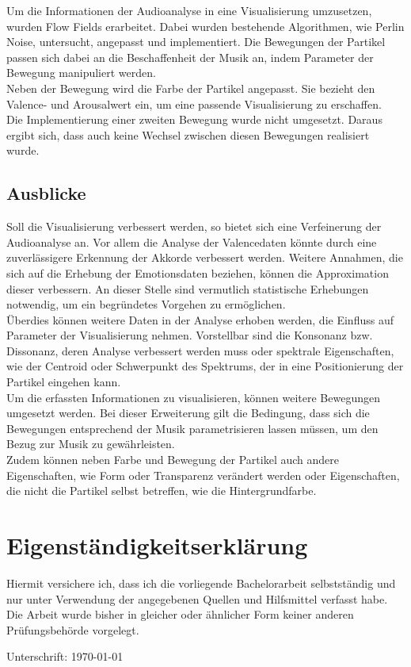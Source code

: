 \documentclass[11pt,a4paper]{article}
\begin{document}
Um die Informationen der Audioanalyse in eine Visualisierung umzusetzen, wurden Flow Fields erarbeitet. Dabei wurden bestehende Algorithmen, wie Perlin Noise, untersucht, angepasst und implementiert. Die Bewegungen der Partikel passen sich dabei an die Beschaffenheit der Musik an, indem Parameter der Bewegung manipuliert werden.\\
Neben der Bewegung wird die Farbe der Partikel angepasst. Sie bezieht den Valence- und Arousalwert ein, um eine passende Visualisierung zu erschaffen.\\
Die Implementierung einer zweiten Bewegung wurde nicht umgesetzt. Daraus ergibt sich, dass auch keine Wechsel zwischen diesen Bewegungen realisiert wurde.\\

\subsection*{Ausblicke}
Soll die Visualisierung verbessert werden, so bietet sich eine Verfeinerung der Audioanalyse an. Vor allem die Analyse der Valencedaten könnte durch eine zuverlässigere Erkennung der Akkorde verbessert werden. Weitere Annahmen, die sich auf die Erhebung der Emotionsdaten beziehen, können die Approximation dieser verbessern. An dieser Stelle sind vermutlich statistische Erhebungen notwendig, um ein begründetes Vorgehen zu ermöglichen.\\
Überdies können weitere Daten in der Analyse erhoben werden, die Einfluss auf Parameter der Visualisierung nehmen. Vorstellbar sind die Konsonanz bzw. Dissonanz, deren Analyse verbessert werden muss oder spektrale Eigenschaften, wie der Centroid oder Schwerpunkt des Spektrums, der in eine Positionierung der Partikel eingehen kann.\\
Um die erfassten Informationen zu visualisieren, können weitere Bewegungen umgesetzt werden. Bei dieser Erweiterung gilt die Bedingung, dass sich die Bewegungen entsprechend der Musik parametrisieren lassen müssen, um den Bezug zur Musik zu gewährleisten.\\
Zudem können neben Farbe und Bewegung der Partikel auch andere Eigenschaften, wie Form oder Transparenz verändert werden oder Eigenschaften, die nicht die Partikel selbst betreffen, wie die Hintergrundfarbe.


\newpage


\newpage
\listoftables
\listoffigures

\newpage
{}
\section{Eigenständigkeitserklärung}
\noindent
Hiermit versichere ich, dass ich die vorliegende Bachelorarbeit selbstständig und nur unter Verwendung der angegebenen Quellen und Hilfsmittel verfasst habe. Die Arbeit wurde bisher in gleicher oder ähnlicher Form keiner anderen Prüfungsbehörde vorgelegt.

\vspace{30pt}
\noindent
Unterschrift: \hfill \today
\end{document}
